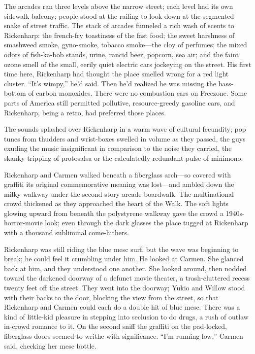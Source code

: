 The arcades ran three levels above the narrow street; each level had its own sidewalk balcony; people stood at the railing to look down at the segmented snake of street traffic. The stack of arcades funneled a rich wash of scents to Rickenharp: the french-fry toastiness of the fast food; the sweet harshness of smashweed smoke, gyno-smoke, tobacco smoke—the cloy of perfumes; the mixed odors of fish-ka-bob stands, urine, rancid beer, popcorn, sea air; and the faint ozone smell of the small, eerily quiet electric cars jockeying on the street. His first time here, Rickenharp had thought the place smelled wrong for a red light cluster. ``It's wimpy,'' he'd said. Then he'd realized he was missing the bass-bottom of carbon monoxides. There were no combustion cars on Freezone. Some parts of America still permitted pollutive, resource-greedy gasoline cars, and Rickenharp, being a retro, had preferred those places.

The sounds splashed over Rickenharp in a warm wave of cultural fecundity; pop tunes from thudders and wrist-boxes swelled in volume as they passed, the guys exuding the music insignificant in comparison to the noise they carried, the skanky tripping of protosalsa or the calculatedly redundant pulse of minimono.

Rickenharp and Carmen walked beneath a fiberglass arch—so covered with graffiti its original commemorative meaning was lost—and ambled down the milky walkway under the second-story arcade boardwalk. The multinational crowd thickened as they approached the heart of the Walk. The soft lights glowing upward from beneath the polystyrene walkway gave the crowd a 1940s-horror-movie look; even through the dark glasses the place tugged at Rickenharp with a thousand subliminal come-hithers.

Rickenharp was still riding the blue mesc surf, but the wave was beginning to break; he could feel it crumbling under him. He looked at Carmen. She glanced back at him, and they understood one another. She looked around, then nodded toward the darkened doorway of a defunct movie theater, a trash-cluttered recess twenty feet off the street. They went into the doorway; Yukio and Willow stood with their backs to the door, blocking the view from the street, so that Rickenharp and Carmen could each do a double hit of blue mesc. There was a kind of little-kid pleasure in stepping into seclusion to do drugs, a rush of outlaw in-crowd romance to it. On the second sniff the graffiti on the pad-locked, fiberglass doors seemed to writhe with significance. ``I'm running low,'' Carmen said, checking her mesc bottle.

